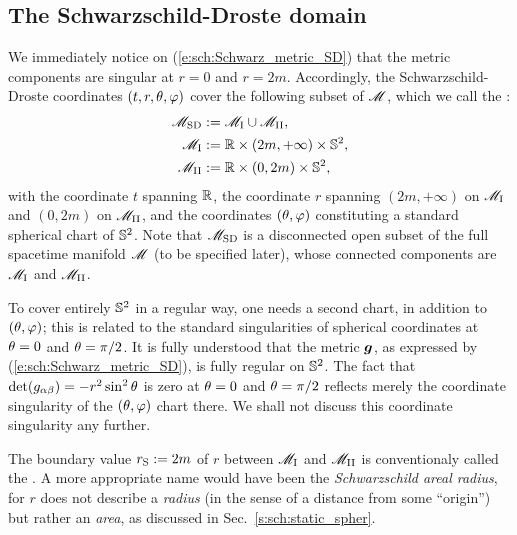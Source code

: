\subsection{The Schwarzschild-Droste domain} \label{s:sch:SD_domain}

We immediately notice on (\ref{e:sch:Schwarz_metric_SD}) that the metric
components are singular at $r=0$ and $r=2m$. Accordingly, the Schwarzschild-Droste coordinates $(t,r,\theta,\varphi)$ cover the following subset of $\mathscr{M}$, which we call the
:
\begin{subequations}
\begin{align}
    \mathscr{M}_{\rm SD} & :=  \mathscr{M}_{\rm I} \cup \mathscr{M}_{\rm II} , \\
    \mathscr{M}_{\rm I} & :=  \mathbb{R}\times(2m,+\infty)\times\mathbb{S}^2 ,\\
    \mathscr{M}_{\rm II} & :=  \mathbb{R}\times(0,2m)\times\mathbb{S}^2 ,
\end{align}
\end{subequations}
with the coordinate $t$ spanning $\mathbb{R}$, the coordinate $r$ spanning $(2m,+\infty)$
on $\mathscr{M}_{\rm I}$ and $(0,2m)$ on $\mathscr{M}_{\rm II}$, and the coordinates $(\theta,\varphi)$
constituting a standard spherical chart of $\mathbb{S}^2$.
Note that $\mathscr{M}_{\rm SD}$ is a disconnected open subset of the full spacetime
manifold $\mathscr{M}$ (to be specified later), whose connected components are
$\mathscr{M}_{\rm I}$ and $\mathscr{M}_{\rm II}$.

\begin{remark}
To cover entirely $\mathbb{S}^2$ in a regular way, one needs a second chart, in
addition to $(\theta,\varphi)$; this is related to the standard singularities of
spherical coordinates at $\theta=0$ and $\theta=\pi/2$. It is fully understood
that the metric $\bm{g}$, as expressed by (\ref{e:sch:Schwarz_metric_SD}), is
fully regular on $\mathbb{S}^2$. The fact that $\det(g_{\alpha\beta}) = -r^2\sin^2\theta$ is zero
at $\theta=0$ and $\theta=\pi/2$ reflects merely the coordinate singularity
of the $(\theta,\varphi)$ chart there. We shall not discuss this coordinate singularity
any further.
\end{remark}

The boundary value $r_{\rm S}:= 2m$ of $r$ between $\mathscr{M}_{\rm I}$ and $\mathscr{M}_{\rm II}$
is conventionaly called the .
A more appropriate name would have been the \emph{Schwarzschild areal radius},
for $r$ does not describe a \emph{radius} (in the sense of a distance from
some ``origin'') but rather an \emph{area}, as discussed in Sec.~\ref{s:sch:static_spher}.

